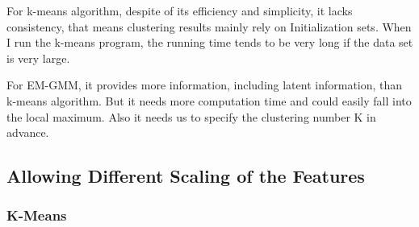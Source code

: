 \documentclass[12pt]{article}
\begin{document}
For k-means algorithm, despite of its efficiency and simplicity, it lacks consistency, that means clustering results mainly rely on Initialization sets. When I run the k-means program, the running time tends to be very long if the data set is very large.

For EM-GMM, it provides more information, including latent information, than k-means algorithm. But it needs more computation time and could easily fall into the local maximum. Also it needs us to specify the clustering number K in advance. 

\subsection{Allowing Different Scaling of the Features}

\subsubsection{K-Means}
\end{document}
